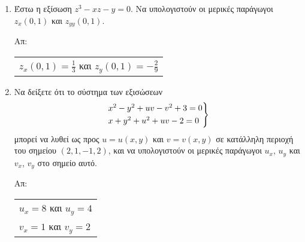 \begin{enumerate}
  \item Έστω η εξίσωση $ z^{3} - xz - y = 0 $.  Να υπολογιστούν οι 
   μερικές παράγωγοι $ z_{x}(0,1) $ και $ z_{yy}(0,1) $. 

    \hfill Απ: \begin{tabular}{l}
      $ z_{x}(0,1) = \frac{1}{3} $ και 
      $ z_{y}(0,1) = -\frac{2}{9} $ 
    \end{tabular}



  \item Να δείξετε ότι το σύστημα των εξισώσεων 
    \[
      \begin{rcases}
        x^{2}-y^{2}+uv-v^{2}+3 = 0 \\
        x+y^{2}+u^{2}+uv-2=0
      \end{rcases}
    \]
    μπορεί να λυθεί ως προς $ u = u(x,y) $ και $ v=v(x,y) $ σε κατάλληλη 
    περιοχή του σημείου $ (2,1,-1,2) $, και να υπολογιστούν οι μερικές παράγωγοι 
    $ u_{x} $, $ u_{y} $ και $ v_{x} $, $ v_{y} $ στο σημείο αυτό.

    \hfill Απ: \begin{tabular}{l}
      $ u_{x} = 8 $ και $ u_{y} = 4 $ \\
      $ v_{x} = 1 $ και $ v_{y} = 2 $
    \end{tabular} 

\end{enumerate}




